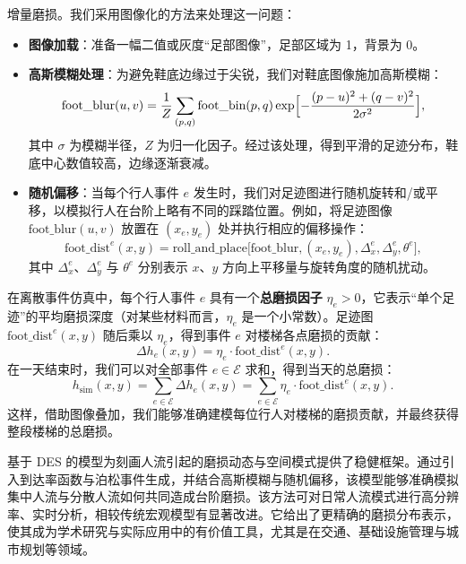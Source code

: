 \documentclass[11pt,a4paper,fontset=windows]{ctexart}
\begin{document}
增量磨损。我们采用图像化的方法来处理这一问题：
\begin{itemize}
\item \textbf{图像加载}：准备一幅二值或灰度“足部图像”，足部区域为 1，背景为 0。
\item \textbf{高斯模糊处理}：为避免鞋底边缘过于尖锐，我们对鞋底图像施加高斯模糊：
\begin{equation}
\text{foot\_blur}(u,v)=\frac{1}{Z}\sum_{(p,q)}\text{foot\_bin}(p,q)
\exp\Bigl[-\frac{(p-u)^2+(q-v)^2}{2\sigma^{2}}\Bigr],
\end{equation}
其中 $\sigma$ 为模糊半径，$Z$ 为归一化因子。经过该处理，得到平滑的足迹分布，鞋底中心数值较高，边缘逐渐衰减。
\item \textbf{随机偏移}：当每个行人事件 $e$ 发生时，我们对足迹图进行随机旋转和/或平移，以模拟行人在台阶上略有不同的踩踏位置。例如，将足迹图像 $\text{foot\_blur}(u,v)$ 放置在 $(x_e,y_e)$ 处并执行相应的偏移操作：
\begin{equation}
\text{foot\_dist}^{e}(x,y)=\text{roll\_and\_place}\bigl[\text{foot\_blur},(x_e,y_e),\Delta_x^{e},\Delta_y^{e},\theta^{e}\bigr],
\end{equation}
其中 $\Delta_x^{e}$、$\Delta_y^{e}$ 与 $\theta^{e}$ 分别表示 $x$、$y$ 方向上平移量与旋转角度的随机扰动。
\end{itemize}

在离散事件仿真中，每个行人事件 $e$ 具有一个\textbf{总磨损因子} $\eta_e>0$，它表示“单个足迹”的平均磨损深度（对某些材料而言，$\eta_e$ 是一个小常数）。足迹图 $\text{foot\_dist}^{e}(x,y)$ 随后乘以 $\eta_e$，得到事件 $e$ 对楼梯各点磨损的贡献：
\begin{equation}
\Delta h_e(x,y)=\eta_e\cdot\text{foot\_dist}^{e}(x,y).
\end{equation}
在一天结束时，我们可以对全部事件 $e\in\mathcal{E}$ 求和，得到当天的总磨损：
\begin{equation}
h_{\text{sim}}(x,y)=\sum_{e\in\mathcal{E}}\Delta h_e(x,y)
=\sum_{e\in\mathcal{E}}\eta_e\cdot\text{foot\_dist}^{e}(x,y).
\end{equation}
这样，借助图像叠加，我们能够准确建模每位行人对楼梯的磨损贡献，并最终获得整段楼梯的总磨损。

基于 DES 的模型为刻画人流引起的磨损动态与空间模式提供了稳健框架。通过引入到达率函数与泊松事件生成，并结合高斯模糊与随机偏移，该模型能够准确模拟集中人流与分散人流如何共同造成台阶磨损。该方法可对日常人流模式进行高分辨率、实时分析，相较传统宏观模型有显著改进。它给出了更精确的磨损分布表示，使其成为学术研究与实际应用中的有价值工具，尤其是在交通、基础设施管理与城市规划等领域。
\end{document}
